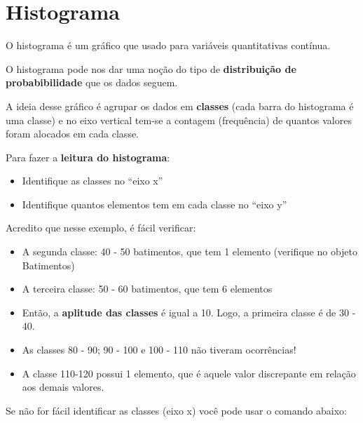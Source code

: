 \documentclass[
]{book}
\newenvironment{Shaded}{\begin{snugshade}}{\end{snugshade}}
\newcommand{\CommentTok}[1]{\textcolor[rgb]{0.56,0.35,0.01}{\textit{#1}}}
\newcommand{\FunctionTok}[1]{\textcolor[rgb]{0.00,0.00,0.00}{#1}}
\newcommand{\NormalTok}[1]{#1}
\newcommand{\SpecialCharTok}[1]{\textcolor[rgb]{0.00,0.00,0.00}{#1}}
\begin{document}
\hypertarget{histograma}{%
\section{Histograma}\label{histograma}}

O histograma é um gráfico que usado para variáveis quantitativas contínua.

O histograma pode nos dar uma noção do tipo de \textbf{distribuição de probabibilidade} que os dados seguem.

A ideia desse gráfico é agrupar os dados em \textbf{classes} (cada barra do histograma é uma classe) e no eixo vertical tem-se a contagem (frequência) de quantos valores foram alocados em cada classe.

Para fazer a \textbf{leitura do histograma}:

\begin{itemize}
\item
  Identifique as classes no ``eixo x''
\item
  Identifique quantos elementos tem em cada classe no ``eixo y''
\end{itemize}

Acredito que nesse exemplo, é fácil verificar:

\begin{itemize}
\item
  A segunda classe: 40 - 50 batimentos, que tem 1 elemento (verifique no objeto Batimentos)
\item
  A terceira classe: 50 - 60 batimentos, que tem 6 elementos
\item
  Então, a \textbf{aplitude das classes} é igual a 10. Logo, a primeira classe é de 30 - 40.
\item
  As classes 80 - 90; 90 - 100 e 100 - 110 não tiveram ocorrências!
\item
  A classe 110-120 possui 1 elemento, que é aquele valor discrepante em relação aos demais valores.
\end{itemize}

Se não for fácil identificar as classes (eixo x) você pode usar o comando abaixo:

\begin{Shaded}
\end{Shaded}
\end{document}
